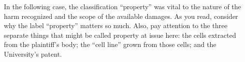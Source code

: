 In the following case, the classification ``property'' was vital to the nature
of the harm recognized and the scope of the available damages.  As you read,
consider why the label ``property'' matters so much.  Also, pay attention to
the three separate things that might be called property at issue here: the
cells extracted from the plaintiff's body; the ``cell line'' grown from those
cells; and the University's patent.

